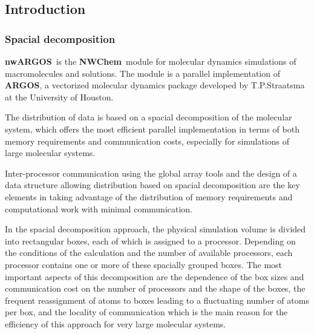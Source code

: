 \label{sec:NWargos}
\newcommand{\mc}[3]{\multicolumn{#1}{#2}{#3}}
\newcommand{\vb}[1]{\mbox{\verb.#1.}}
\newcommand{\none}{\multicolumn{2}{|c|}{ }}
\renewcommand{\thetable}{\Roman{table}}
\newcommand{\mcc}[1]{\multicolumn{2}{c}{#1}}
\def\bmu{\mbox{\boldmath $\mu$}}
\def\bE{\mbox{\bf E}}
\def\br{\mbox{\bf r}}
\def\tT{\tilde{T}}
\def\t{\tilde{1}}
\def\ip{i\prime}
\def\jp{j\prime}
\def\ipp{i\prime\prime}
\def\jpp{j\prime\prime}
\def\etal{{\sl et al.}}
\def\nwchem{{\bf NWChem}}
\def\nwargos{{\bf nwARGOS}}
\def\nwtop{{\bf nwTOP}}
\def\nwrst{{\bf nwRST}}
\def\nwsgm{{\bf nwSGM}}
\def\argos{{\bf ARGOS}}
\subsection{Introduction}
\subsubsection{Spacial decomposition}
\nwargos\  is the \nwchem\  module for molecular dynamics
simulations of macromolecules and solutions. The module is a parallel
implementation of \argos, a vectorized molecular dynamics
package developed by T.P.Straatsma at the University of Houston.
\par
The distribution of data is based on a spacial decomposition of 
the molecular system, which offers the most efficient parallel 
implementation in terms of both memory requirements and
communication costs, especially for simulations of large molecular 
systems.
\par
Inter-processor communication using the global array tools and the
design of a data structure allowing distribution based on spacial
decomposition are the key elements in taking advantage of
the distribution of memory requirements and computational work with
minimal communication.
\par
In the spacial decomposition approach, the physical simulation
volume is divided into rectangular boxes, each of which is
assigned to a processor. Depending on the conditions of the 
calculation and the number of available processors, each processor 
contains one or more of these spacially grouped boxes.
The most important aspects of this decomposition are the dependence 
of the box sizes and communication cost on the number of processors 
and the shape of the boxes, the frequent reassignment of atoms to 
boxes leading to a fluctuating number of atoms per box, and the 
locality of communication which is the main reason for the efficiency 
of this approach for very large molecular systems.
